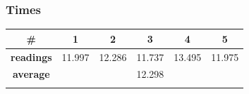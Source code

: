 \documentclass[a4paper, 10pt]{article}
\begin{document}
\subsubsection{Times}
\begin{table}[H]
\centering
\begin{tabular}{cccccc}
\hline
\multicolumn{1}{|c|}{\textbf{\#}}       & \multicolumn{1}{c|}{\textbf{1}} & \multicolumn{1}{c|}{\textbf{2}} & \multicolumn{1}{c|}{\textbf{3}} & \multicolumn{1}{c|}{\textbf{4}} & \multicolumn{1}{c|}{\textbf{5}} \\ \hline
\multicolumn{1}{|c|}{\textbf{readings}} & \multicolumn{1}{c|}{11.997}           & \multicolumn{1}{c|}{12.286}           & \multicolumn{1}{c|}{11.737}           & \multicolumn{1}{c|}{13.495}           & \multicolumn{1}{c|}{11.975}           \\ \hline
\multicolumn{1}{|c|}{\textbf{average}}      & \multicolumn{5}{c|}{12.298}                                                                                                                                                   \\ \hline
\textbf{}                               & \textbf{}                       & \textbf{}                       & \textbf{}                       & \textbf{}                       & \textbf{}                      
\end{tabular}
\end{table}
\end{document}
